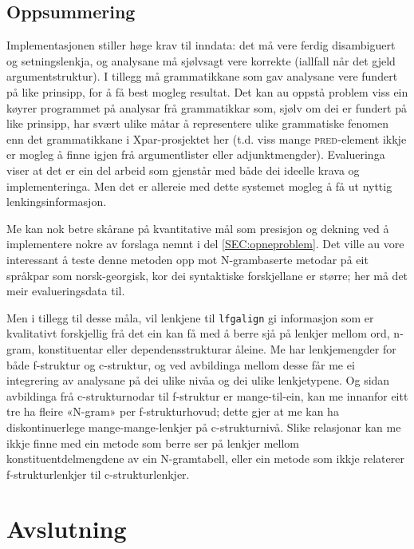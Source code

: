\documentclass[12pt,a4paper,oneside,draft]{report}
\newcommand{\F}[2]{\textsc{#1}\ensuremath{_{#2}}}
\newcommand{\PRED}{\F{pred}{}}
\begin{document}
\section{Oppsummering}
\label{sec-5.6}

Implementasjonen stiller høge krav til inndata: det må vere ferdig
 disambiguert og setningslenkja, og analysane må sjølvsagt vere
 korrekte (iallfall når det gjeld argumentstruktur). I tillegg må
 grammatikkane som gav analysane vere fundert på like prinsipp, for å
 få best mogleg resultat. Det kan au oppstå problem viss ein køyrer
 programmet på analysar frå grammatikkar som, sjølv om dei er fundert
 på like prinsipp, har svært ulike måtar å representere ulike
 grammatiske fenomen enn det grammatikkane i Xpar-prosjektet her
 (t.d. viss mange \PRED{}-element ikkje er mogleg å finne igjen frå
 argumentlister eller adjunktmengder). Evalueringa viser at det er ein
 del arbeid som gjenstår med både dei ideelle krava og
 implementeringa. Men det er allereie med dette systemet mogleg å få
 ut nyttig lenkingsinformasjon.

Me kan nok betre skårane på kvantitative mål som presisjon og dekning
 ved å implementere nokre av forslaga nemnt i del
 \ref{SEC:opneproblem}. Det ville au vore interessant å teste denne
 metoden opp mot N-grambaserte metodar på eit språkpar som
 norsk-georgisk, kor dei syntaktiske forskjellane er større; her må
 det meir evalueringsdata til.

Men i tillegg til desse måla, vil lenkjene til \texttt{lfgalign} gi
 informasjon som er kvalitativt forskjellig frå det ein kan få med å
 berre sjå på lenkjer mellom ord, n-gram, konstituentar eller
 dependensstrukturar åleine. Me har lenkjemengder for både f-struktur
 og c-struktur, og ved avbildinga mellom desse får me ei integrering
 av analysane på dei ulike nivåa og dei ulike lenkjetypene. Og sidan
 avbildinga frå c\hyp{}strukturnodar til f\hyp{}struktur er
 mange-til-ein, kan me innanfor eitt tre ha fleire «N-gram» per
 f\hyp{}strukturhovud; dette gjer at me kan ha diskontinuerlege
 mange-mange-lenkjer på c\hyp{}strukturnivå.  Slike relasjonar kan me
 ikkje finne med ein metode som berre ser på lenkjer mellom
 konstituentdelmengdene av ein N-gramtabell,
 eller ein metode som ikkje relaterer f\hyp{}strukturlenkjer til
 c\hyp{}strukturlenkjer.



     
\chapter{Avslutning}
\label{sec-6}
\end{document}
